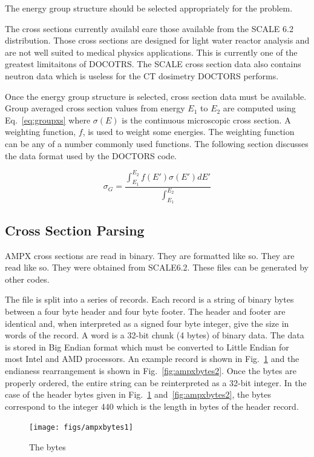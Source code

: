 The energy group structure should be selected appropriately for the problem.

The cross sections currently availabl eare those available from the SCALE 6.2 distribution. Those cross sections are designed for light water reactor analysis and are not well suited to medical physics applications. This is currently one of the greatest limitaitons of DOCOTRS. The SCALE cross section data also contains neutron data which is useless for the CT dosimetry DOCTORS performs.

Once the energy group structure is selected, cross section data must be available. Group averaged cross section values from energy $E_1$ to $E_2$ are computed using Eq.~\ref{eq:groupxs} where $\sigma(E)$ is the continuous microscopic cross section. A weighting function, $f$, is used to weight some energies. The weighting function can be any of a number commonly used functions. The following section discusses the data format used by the DOCTORS code.

\begin{equation}\label{eq:groupxs}
\sigma_G = \frac{\int_{E_1}^{E_2}f(E')\sigma(E') dE'}{\int_{E_1}^{E_2}}
\end{equation}

\subsection{Cross Section Parsing}
AMPX cross sections are read in binary. They are formatted like so. They are read like so. They were obtained from SCALE6.2. These files can be generated by other codes.

The file is split into a series of records. Each record is a string of binary bytes between a four byte header and four byte footer. The header and footer are identical and, when interpreted as a signed four byte integer, give the size in words of the record. A word is a 32-bit chunk (4 bytes) of binary data. The data is stored in Big Endian format which must be converted to Little Endian for most Intel and AMD processors. An example record is shown in Fig.~\ref{fig:ampxbytes1} and the endianess rearrangement is shown in Fig.~\ref{fig:ampxbytes2}. Once the bytes are properly ordered, the entire string can be reinterpreted as a 32-bit integer. In the case of the header bytes given in Fig.~\ref{fig:ampxbytes1} and~\ref{fig:ampxbytes2}, the bytes correspond to the integer 440 which is the length in bytes of the header record.

\begin{figure}[tb]
  \begin{center}
   \texttt{[image: figs/ampxbytes1]}
  \end{center}
  \caption{The bytes}
\label{fig:ampxbytes1}
\end{figure}

